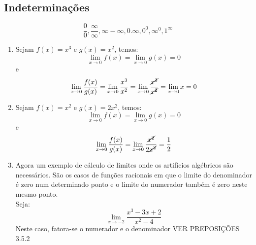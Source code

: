 \documentclass{article}
\begin{document}
		\subsection{Indeterminações}
			\begin{equation*}
				\frac{0}{0}, \frac{\infty}{\infty}, \infty - \infty, 0.\infty, 0^0, \infty^0,1^\infty	
			\end{equation*}
			\begin{enumerate}
				\item Sejam $f(x) = x^3$ e $g(x) = x^2$, temos:\\
				\[ \lim_{x\to 0}f(x) = \lim_{x\to 0}g(x) = 0 \]
				e
				\[ \lim_{x\to 0}\frac{f(x)}{g(x)} = \lim_{x\to 0}\frac{x^3}{x^2} = \lim_{x\to 0}
				\frac{\cancel{x^{3}}}{\cancel{x^2}} = \lim_{x\to 0}x = 0\]
				
				\item Sejam $f(x) = x^2$ e $g(x) = 2x^2$, temos:\\
				\[ \lim_{x\to 0}f(x) = \lim_{x\to 0}g(x) = 0\]
				e
				\[ \lim_{x\to 0}\frac{f(x)}{g(x)} = \lim_{x\to 0}\frac{\cancel{x^2}}{2\cancel{x^2}} = \frac{1}{2} \]
				
				\item Agora um exemplo de  cálculo de limites onde os artifícios algébricos são necessários. São os casos de funções racionais em que o limite do denominador é zero num determinado ponto e o limite do numerador também é zero neste mesmo ponto.\\
				
				Seja:\\
				\[ \lim_{x\to -2}\frac{x^3-3x+2}{x^2-4} \]
				Neste caso, fatora-se o numerador e o denominador VER PREPOSIÇÕES 3.5.2
			\end{enumerate}
			
\end{document}

